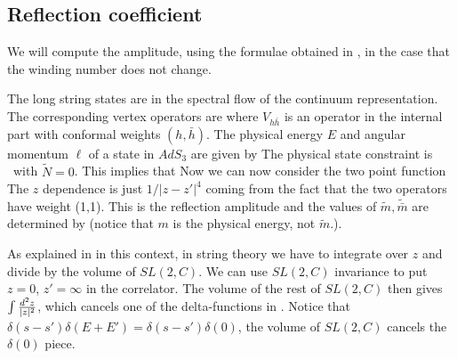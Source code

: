 \subsection{Reflection coefficient}

We will compute the amplitude, using the formulae obtained
in 
\cite{Dorn:1994xn,Zamolodchikov:1996aa,Teschner:1997ft,Zamolodchikov:unpub},
in the case that the winding number
does not change. 


The long string states are in the spectral flow of the continuum
representation. 
The corresponding vertex operators are 
where $V_{h \bar h}$ is an operator in the internal part with
conformal weights $(h,\bar h)$. 
The physical energy $E$ and angular momentum $\ell$ 
of a state in $AdS_3$ are given by
The physical state constraint is \onshcon\ with $\tilde{N}=0$.
%
This 
 implies that
Now we can now consider the  two point function 
\cite{Teschner:1997ft,Teschner:1999ug,Zamolodchikov:unpub} 
The $z$ dependence is just $1/|z -z'|^4$ coming from the fact that the
two operators have weight (1,1). 
This is the reflection amplitude and the values of $\tilde m, \tilde{\bar m}$ are
determined
by \ener 
(notice that  $ m$ is the physical energy, not $\tilde m$.).

As explained in \cite{Giveon:1998ns} in this context, 
in string theory we have to integrate over $z$ and divide by the 
volume of $SL(2,C)$.  
We can use $SL(2,C)$ invariance to put $z=0$, $z' = \infty$ in the  
correlator. The volume of the rest of $SL(2,C)$ then gives
 $ \int { d^2 z \over |z|^2}$, which
cancels  one of the delta-functions in \zamtwo .
Notice that $\delta(s-s') \delta(E+E') =\delta(s-s') \delta(0)$,
the volume of $SL(2,C)$ 
cancels the $\delta(0) $ piece. 

